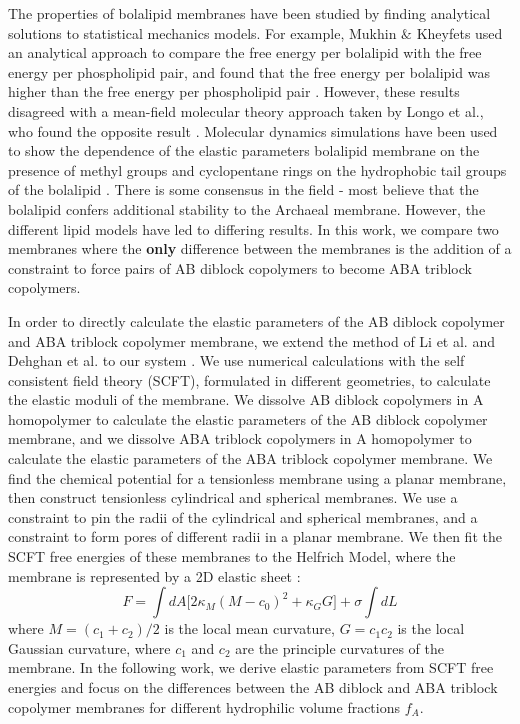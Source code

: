 \documentclass[twocolumn,aps,floatfix,nobibnotes]{revtex4-1}
\begin{document}
The properties of bolalipid membranes have been studied by finding analytical solutions to statistical mechanics models. For example, Mukhin $\&$ Kheyfets used an analytical approach to compare the free energy per bolalipid with the free energy per phospholipid pair, and found that the free energy per bolalipid was higher than the free energy per phospholipid pair \cite{mukhin2010analytical}. However, these results disagreed with a mean-field molecular theory approach taken by Longo et al., who found the opposite result \cite{longo2007stability}. Molecular dynamics simulations have been used to show the dependence of the elastic parameters bolalipid membrane on the presence of methyl groups and cyclopentane rings on the hydrophobic tail groups of the bolalipid \cite{bulacu2011silico,chugunov2014liquid}. There is some consensus in the field - most believe that the bolalipid confers additional stability to the Archaeal membrane. However, the different lipid models have led to differing results. In this work, we compare two membranes where the \textbf{only} difference between the membranes is the addition of a constraint to force pairs of AB diblock copolymers to become ABA triblock copolymers.

In order to directly calculate the elastic parameters of the AB diblock copolymer and ABA triblock copolymer membrane, we extend the method of Li et al. and Dehghan et al. to our system \cite{li2013elastic,dehghan2015line}.  We use numerical calculations with the self consistent field theory (SCFT), formulated in different geometries, to calculate the elastic moduli of the membrane. We dissolve AB diblock copolymers in A homopolymer to calculate the elastic parameters of the AB diblock copolymer membrane, and we dissolve ABA triblock copolymers in A homopolymer to calculate the elastic parameters of the ABA triblock copolymer membrane. We find the chemical potential for a tensionless membrane using a planar membrane, then construct tensionless cylindrical and spherical membranes. We use a constraint to pin the radii of the cylindrical and spherical membranes, and a constraint to form pores of different radii in a planar membrane. We then fit the SCFT free energies of these membranes to the Helfrich Model, where the membrane is represented by a 2D elastic sheet \cite{canham1970minimum,helfrich1973elastic,evans1974bending}:
\begin{equation}
F = \int dA \big[2 \kappa_M (M - c_0)^2 + \kappa_G G\big] + \sigma \int dL
\end{equation}
where $M = (c_1+c_2)/2$ is the local mean curvature, $G = c_1c_2$ is the local Gaussian curvature, where $c_1$ and $c_2$ are the principle curvatures of the membrane. In the following work, we derive elastic parameters from SCFT free energies and focus on the differences between the AB diblock and ABA triblock copolymer membranes for different hydrophilic volume fractions $f_A$. 
\end{document}

